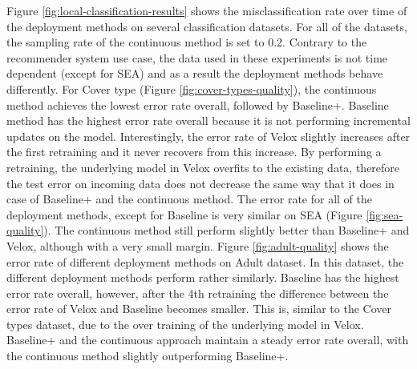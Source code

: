 \documentclass{vldb}
\begin{document}
Figure \ref{fig:local-classification-results} shows the misclassification rate over time of the deployment methods on several classification datasets.
For all of the datasets, the sampling rate of the continuous method is set to 0.2.
Contrary to the recommender system use case, the data used in these experiments is not time dependent (except for SEA) and as a result the deployment methods behave differently.
For Cover type (Figure \ref{fig:cover-types-quality}), the continuous method achieves the lowest error rate overall, followed by Baseline+.
Baseline method has the highest error rate overall because it is not performing incremental updates on the model.
Interestingly, the error rate of Velox slightly increases after the first retraining and it never recovers from this increase.
By performing a retraining, the underlying model in Velox overfits to the existing data, therefore the test error on incoming data does not decrease the same way that it does in case of Baseline+ and the continuous method.
The error rate for all of the deployment methods, except for Baseline is very similar on SEA (Figure \ref{fig:sea-quality}).
The continuous method still perform slightly better than Baseline+ and Velox, although with a very small margin.
Figure \ref{fig:adult-quality} shows the error rate of different deployment methods on Adult dataset.
In this dataset, the different deployment methods perform rather similarly.
Baseline has the highest error rate overall, however, after the 4th retraining the difference between the error rate of Velox and Baseline becomes smaller.
This is, similar to the Cover types dataset, due to the over training of the underlying model in Velox.
Baseline+ and the continuous approach maintain a steady error rate overall, with the continuous method slightly outperforming Baseline+.
\end{document}
